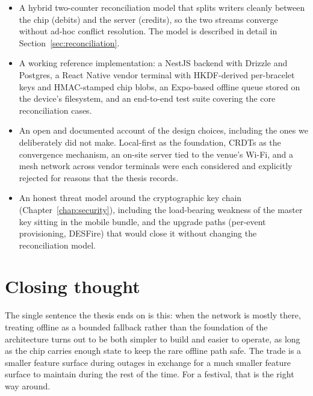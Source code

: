 \begin{itemize}
	\item A hybrid two-counter reconciliation model that splits writers cleanly between the chip (debits) and the server (credits), so the two streams converge without ad-hoc conflict resolution. The model is described in detail in Section~\ref{sec:reconciliation}.
	\item A working reference implementation: a NestJS backend with Drizzle and Postgres, a React Native vendor terminal with HKDF-derived per-bracelet keys and HMAC-stamped chip blobs, an Expo-based offline queue stored on the device's filesystem, and an end-to-end test suite covering the core reconciliation cases.
	\item An open and documented account of the design choices, including the ones we deliberately did not make. Local-first as the foundation, CRDTs as the convergence mechanism, an on-site server tied to the venue's Wi-Fi, and a mesh network across vendor terminals were each considered and explicitly rejected for reasons that the thesis records.
	\item An honest threat model around the cryptographic key chain (Chapter~\ref{chap:security}), including the load-bearing weakness of the master key sitting in the mobile bundle, and the upgrade paths (per-event provisioning, DESFire) that would close it without changing the reconciliation model.
\end{itemize}

\section{Closing thought}
\label{sec:closing}

The single sentence the thesis ends on is this: when the network is mostly there, treating offline as a bounded fallback rather than the foundation of the architecture turns out to be both simpler to build and easier to operate, as long as the chip carries enough state to keep the rare offline path safe. The trade is a smaller feature surface during outages in exchange for a much smaller feature surface to maintain during the rest of the time. For a festival, that is the right way around.
